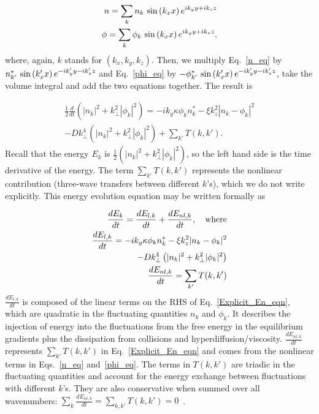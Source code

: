 \documentclass[twocolumn,showkeys,superscriptaddress]{revtex4}
\def\beqar{\begin{eqnarray}}
\def\eeqar{\end{eqnarray}}
\newcommand{\diff}[2]{\frac{d#1}{d#2}}
\begin{document}
\beqar
\label{subs_fourier_n}
n = \sum_{k} n_k \ {\rm sin} \left( k_x x \right) e^{i k_y y + i k_z z} \\
\label{subs_fourier_phi}
\phi = \sum_{k} \phi_k \ {\rm sin} \left( k_x x \right) e^{i k_y y + i k_z z},
\eeqar
where, again, $k$ stands for $(k_x,k_y,k_z)$.
Then, we multiply Eq.~\ref{n_eq} by $n^*_{k'} \ {\rm sin} \left( k'_x x \right) e^{-i k'_y y - i k'_z z}$ and Eq.~\ref{phi_eq} by 
$-\phi^*_{k'} \ {\rm sin} \left( k'_x x \right) e^{-i k'_y y - i k'_z z}$, take the volume integral and add the two equations together. The result is

\beqar
\label{Explicit_En_eqn}
\frac{1}{2} \diff{}{t} \left( |n_k|^2 + k^2_\perp |\phi_k|^2 \right) = -i k_y \kappa \phi_k n^*_k - \xi k_z^2 |n_k - \phi_k|^2 \nonumber \\
- D k^4_\perp \left( |n_k|^2 + k^2_\perp |\phi_k|^2 \right) + \sum_{k'} T(k,k'). \quad \quad
\eeqar
Recall that the energy $E_k$ is $\frac{1}{2} \left( |n_k|^2 + k^2_\perp |\phi_k|^2 \right)$, so the left hand side is the time derivative of the energy.
The term $\sum_{k'} T(k,k')$ represents the nonlinear contribution (three-wave transfers between different $k$'s), 
which we do not write explicitly. This energy evolution equation may be written formally as

\beqar
\label{dEdt_def}
\diff{E_k}{t} = \diff{E_{l,k}}{t} + \diff{E_{nl,k}}{t}, \quad {\rm where}\\
\label{dEl_dt_def}
\diff{E_{l,k}}{t} = -i k_y \kappa \phi_k n^*_k - \xi k_z^2 |n_k - \phi_k|^2 \nonumber \\
- D k^4_\perp \left( |n_k|^2 + k^2_\perp |\phi_k|^2 \right) \\
\label{dEnl_dt_def}
 \diff{E_{nl,k}}{t} = \sum_{k'} T(k,k')
\eeqar
$\diff{E_{l,k}}{t}$ is composed of the linear terms on the RHS of Eq.~\ref{Explicit_En_eqn}, which are quadratic in the fluctuating quantities $n_k$ and $\phi_k$.
It describes the injection of energy into the fluctuations from the free energy in the equilibrium gradients plus the dissipation from collisions and hyperdiffusion/viscosity.
$\diff{E_{nl,k}}{t}$ represents $\sum_{k'} T(k,k')$ in  Eq.~\ref{Explicit_En_eqn} and comes from the nonlinear terms in Eqs.~\ref{n_eq} and~\ref{phi_eq}. 
The terms in $T(k,k')$ are triadic in the fluctuating quantities and account for the energy exchange between fluctuations with different $k$'s. 
They are also conservative when summed over all wavenumbers: $\sum_{k} \diff{E_{nl,k}}{t} = \sum_{k,k'} T(k,k') = 0$~\cite{camargo1995}.
\end{document}
